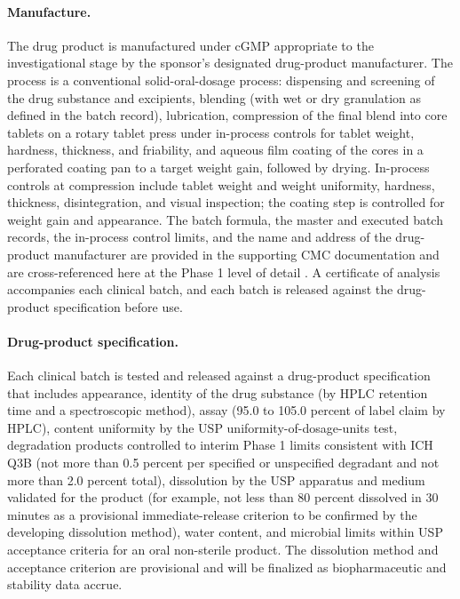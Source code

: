 \paragraph{Manufacture.}
The drug product is manufactured under cGMP appropriate to the investigational
stage by the sponsor's designated drug-product manufacturer. The process is a
conventional solid-oral-dosage process: dispensing and screening of the drug
substance and excipients, blending (with wet or dry granulation as defined in the
batch record), lubrication, compression of the final blend into core tablets on a
rotary tablet press under in-process controls for tablet weight, hardness,
thickness, and friability, and aqueous film coating of the cores in a perforated
coating pan to a target weight gain, followed by drying. In-process controls at
compression include tablet weight and weight uniformity, hardness, thickness,
disintegration, and visual inspection; the coating step is controlled for weight
gain and appearance. The batch formula, the master and executed batch records,
the in-process control limits, and the name and address of the drug-product
manufacturer are provided in the supporting CMC documentation and are
cross-referenced here at the Phase 1 level of detail \cite{phase1guidance}. A
certificate of analysis accompanies each clinical batch, and each batch is
released against the drug-product specification before use.

\paragraph{Drug-product specification.}
Each clinical batch is tested and released against a drug-product specification
that includes appearance, identity of the drug substance (by HPLC retention time
and a spectroscopic method), assay (95.0 to 105.0 percent of label claim by HPLC),
content uniformity by the USP uniformity-of-dosage-units test, degradation
products controlled to interim Phase 1 limits consistent with ICH Q3B (not more
than 0.5 percent per specified or unspecified degradant and not more than 2.0
percent total), dissolution by the USP apparatus and medium validated for the
product (for example, not less than 80 percent dissolved in 30 minutes as a
provisional immediate-release criterion to be confirmed by the developing
dissolution method), water content, and microbial limits within USP acceptance
criteria for an oral non-sterile product. The dissolution method and acceptance
criterion are provisional and will be finalized as biopharmaceutic and stability
data accrue.

